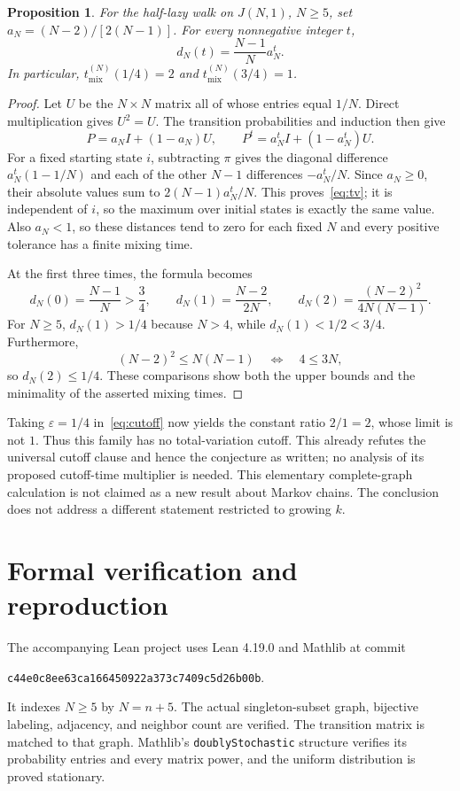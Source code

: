 \documentclass[11pt]{article}
\newtheorem{proposition}{Proposition}
\newcommand{\tmix}{t_{\mathrm{mix}}}
\begin{document}
\begin{proposition}
For the half-lazy walk on $J(N,1)$, $N\geq5$, set $a_N=(N-2)/[2(N-1)]$. For every nonnegative integer $t$,
\begin{equation}\label{eq:tv}
 d_N(t)=\frac{N-1}{N}a_N^t.
\end{equation}
In particular, $\tmix^{(N)}(1/4)=2$ and $\tmix^{(N)}(3/4)=1$.
\end{proposition}
\begin{proof}
Let $U$ be the $N\times N$ matrix all of whose entries equal $1/N$. Direct multiplication gives $U^2=U$. The transition probabilities and induction then give
\[
 P=a_N I+(1-a_N)U,\qquad P^t=a_N^t I+(1-a_N^t)U.
\]
For a fixed starting state $i$, subtracting $\pi$ gives the diagonal difference $a_N^t(1-1/N)$ and each of the other $N-1$ differences $-a_N^t/N$. Since $a_N\geq0$, their absolute values sum to $2(N-1)a_N^t/N$. This proves~\eqref{eq:tv}; it is independent of $i$, so the maximum over initial states is exactly the same value. Also $a_N<1$, so these distances tend to zero for each fixed $N$ and every positive tolerance has a finite mixing time.

At the first three times, the formula becomes
\[
 d_N(0)=\frac{N-1}{N}>\frac34,\qquad
 d_N(1)=\frac{N-2}{2N},\qquad
 d_N(2)=\frac{(N-2)^2}{4N(N-1)}.
\]
For $N\geq5$, $d_N(1)>1/4$ because $N>4$, while $d_N(1)<1/2<3/4$. Furthermore,
\[
 (N-2)^2\leq N(N-1)\quad\Longleftrightarrow\quad4\leq3N,
\]
so $d_N(2)\leq1/4$. These comparisons show both the upper bounds and the minimality of the asserted mixing times.
\end{proof}

Taking $\varepsilon=1/4$ in~\eqref{eq:cutoff} now yields the constant ratio $2/1=2$, whose limit is not $1$. Thus this family has no total-variation cutoff. This already refutes the universal cutoff clause and hence the conjecture as written; no analysis of its proposed cutoff-time multiplier is needed. This elementary complete-graph calculation is not claimed as a new result about Markov chains. The conclusion does not address a different statement restricted to growing $k$.

\section*{Formal verification and reproduction}
The accompanying Lean project uses Lean 4.19.0 and Mathlib at commit
\begin{center}\small\texttt{c44e0c8ee63ca166450922a373c7409c5d26b00b}.\end{center}
It indexes $N\geq5$ by $N=n+5$. The actual singleton-subset graph, bijective labeling, adjacency, and neighbor count are verified. The transition matrix is matched to that graph. Mathlib's \texttt{doublyStochastic} structure verifies its probability entries and every matrix power, and the uniform distribution is proved stationary.
\end{document}
